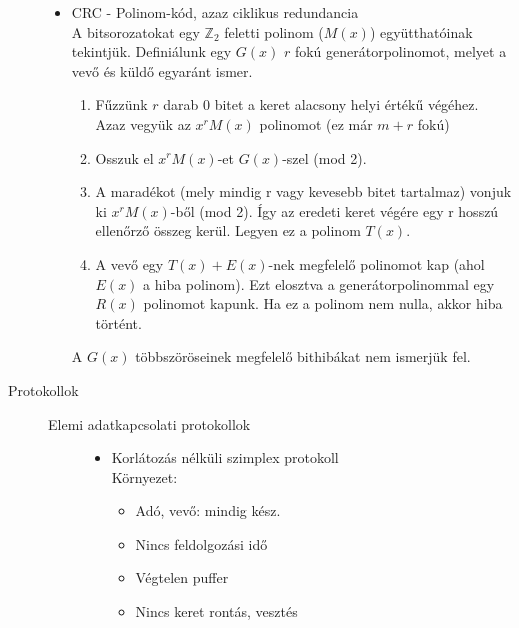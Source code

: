 \documentclass[margin=0px]{article}
\begin{document}
\begin{description}
\begin{itemize}
            \item CRC - Polinom-kód, azaz ciklikus redundancia \\
                  A bitsorozatokat egy $\mathbb{Z}_2$ feletti polinom ($M(x)$) együtthatóinak tekintjük. Definiálunk egy $G(x)$ $r$ fokú generátorpolinomot, melyet a vevő és küldő egyaránt ismer.
                  \begin{enumerate}
                      \item Fűzzünk $r$ darab 0 bitet a keret alacsony helyi értékű végéhez. Azaz vegyük az $x^rM(x)$ polinomot (ez már $m+r$ fokú)
                      \item Osszuk el $x^rM(x)$-et $G(x)$-szel (mod 2).
                      \item A maradékot (mely mindig r vagy kevesebb bitet tartalmaz) vonjuk ki $x^rM(x)$-ből (mod 2). Így az eredeti keret végére egy r hosszú ellenőrző összeg kerül. Legyen ez a polinom $T(x)$.
                      \item A vevő egy $T(x)+E(x)$-nek megfelelő polinomot kap (ahol $E(x)$ a hiba polinom). Ezt elosztva a generátorpolinommal egy $R(x)$ polinomot kapunk. Ha ez a polinom nem nulla, akkor hiba történt.
                  \end{enumerate}
                  A $G(x)$ többszöröseinek megfelelő bithibákat nem ismerjük fel.
        \end{itemize}
    \item[Protokollok] \hfill
        \begin{description}
            \item[Elemi adatkapcsolati protokollok] \hfill
                \begin{itemize}
                    \item Korlátozás nélküli szimplex protokoll\\
                          Környezet:
                          \begin{itemize}
                              \item Adó, vevő: mindig kész.
                              \item Nincs feldolgozási idő
                              \item Végtelen puffer
                              \item Nincs keret rontás, vesztés
                          \end{itemize}


\end{itemize}
\end{description}
\end{description}
\end{document}
